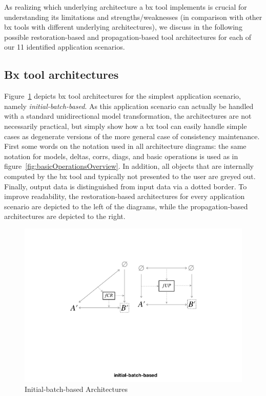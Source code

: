 As realizing which underlying architecture a bx tool implements is crucial for understanding its limitations and strengths/weaknesses (in comparison with other bx tools with different underlying architectures), we discuss in the following possible restoration-based and propagation-based tool architectures for each of our 11 identified application scenarios. 

\subsection{Bx tool architectures}
\label{sec:bx-tool-architectures}

Figure~\ref{fig:initialBatchBased} depicts bx tool architectures for the simplest application scenario, namely \emph{initial-batch-based}.
As this application scenario can actually be handled with a standard unidirectional model transformation, the architectures are not necessarily practical, but simply show how a bx tool can easily handle simple cases as degenerate versions of the more general case of consistency maintenance.
First some words on the notation used in all architecture diagrams: the same notation for models, deltas, corrs, diags, and basic operations is used as in figure~\ref{fig:basicOperationsOverview}.
In addition, all objects that are internally computed by the bx tool and typically not presented to the user are greyed out.
Finally, output data is distinguished from input data via a dotted border.
To improve readability, the restoration-based architectures for every application scenario are depicted to the left of the diagrams, while the propagation-based architectures are depicted to the right.
%
\begin{figure}[tb!]
	\centering
	\includegraphics[width=0.8\columnwidth]{diagrams/foundations//initial-batch-based}
	\caption{Initial-batch-based Architectures}
	\label{fig:initialBatchBased}
\end{figure}

